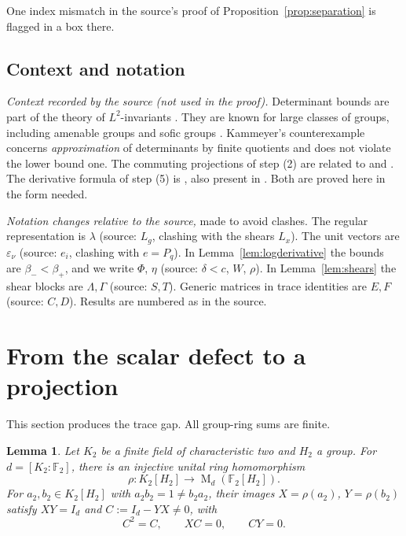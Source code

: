 \documentclass[11pt]{article}
\newtheorem{lemma}[theorem]{Lemma}
\theoremstyle{remark}
\numberwithin{equation}{section}
\newcommand{\F}{\mathbb F}
\newcommand{\Mat}{\operatorname{M}}
\begin{document}
One index mismatch in the source's proof of Proposition~\ref{prop:separation} is flagged in a box there.

\subsection{Context and notation}

\emph{Context recorded by the source (not used in the proof).} Determinant bounds are part of the theory of $L^2$-invariants \cite{Luck2002}. They are known for large classes of groups, including amenable groups \cite[Theorem 1.21, with its erratum]{Schick2001} and sofic groups \cite[Theorem 5]{ElekSzabo2005}. Kammeyer's counterexample \cite[Theorem 2 and Section 2]{Kammeyer2026} concerns \emph{approximation} of determinants by finite quotients and does not violate the lower bound one. The commuting projections of step (2) are related to \cite[Section 3]{DicksSchick2002} and \cite[Section 2]{LehnerNeuhauserWoess2008}. The derivative formula of step (5) is \cite[Lemma 2]{FK1952}, also present in \cite[Lemma 1 and Proposition 2(d)]{deLaHarpeSkandalis1984}. Both are proved here in the form needed.

\emph{Notation changes relative to the source,} made to avoid clashes. The regular representation is $\lambda$ (source: $L_g$, clashing with the shears $L_x$). The unit vectors are $\varepsilon_\nu$ (source: $e_i$, clashing with $e=P_q$). In Lemma~\ref{lem:logderivative} the bounds are $\beta_-<\beta_+$, and we write $\Phi$, $\eta$ (source: $\delta<c$, $W$, $\rho$). In Lemma~\ref{lem:shears} the shear blocks are $\Lambda,\Gamma$ (source: $S,T$). Generic matrices in trace identities are $E,F$ (source: $C,D$). Results are numbered as in the source.

\section{From the scalar defect to a projection}
\label{sec:projection}

This section produces the trace gap. All group-ring sums are finite.

\begin{lemma}\label{lem:binary}
Let $K_2$ be a finite field of characteristic two and $H_2$ a group.
For $d=[K_2:\F_2]$, there is an injective unital ring homomorphism
\[
 \rho:K_2[H_2]\longrightarrow\Mat_d(\F_2[H_2]).
\]
For $a_2,b_2\in K_2[H_2]$ with $a_2b_2=1\ne b_2a_2$, their images $X=\rho(a_2)$, $Y=\rho(b_2)$ satisfy
$XY=I_d$ and $C:=I_d-YX\ne0$, with
\begin{equation}\label{eq:defect}
 C^2=C,\qquad XC=0,\qquad CY=0.
\end{equation}
\end{lemma}
\end{document}
